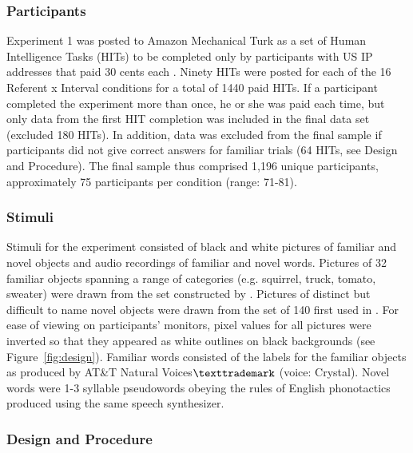 \documentclass[authoryear,review]{elsarticle}
\begin{document}
\subsubsection{Participants}

Experiment 1 was posted to Amazon Mechanical Turk as a set of Human Intelligence Tasks (HITs) to be completed only by participants with US IP addresses that paid 30 cents each \citep[for a detailed comparison of laboratory and Mechanical Turk studies see][]{Crump2013}. Ninety HITs were posted for each of the 16 Referent x Interval conditions for a total of 1440 paid HITs. If a participant completed the experiment more than once, he or she was paid each time, but only data from the first HIT completion was included in the final data set (excluded 180 HITs). In addition, data was excluded from the final sample if participants did not give correct answers for familiar trials (64 HITs, see Design and Procedure). The final sample thus comprised 1,196 unique participants, approximately 75 participants per condition (range: 71-81).

\subsubsection{Stimuli}

Stimuli for the experiment consisted of black and white pictures of familiar and novel objects and audio recordings of familiar and novel words. Pictures of 32 familiar objects spanning a range of categories (e.g. squirrel, truck, tomato, sweater) were drawn from the set constructed by \citet{Snodgrass1980}. Pictures of distinct but difficult to name novel objects were drawn from the set of 140 first used in \citet{Kanwisher1997}. For ease of viewing on participants' monitors, pixel values for all pictures were inverted so that they appeared as white outlines on black backgrounds (see Figure~\ref{fig:design}). Familiar words consisted of the labels for the familiar objects as produced by AT\&T Natural Voices$\texttrademark$ (voice: Crystal). Novel words were 1-3 syllable pseudowords obeying the rules of English phonotactics produced using the same speech synthesizer. 

\subsubsection{Design and Procedure}
\end{document}

